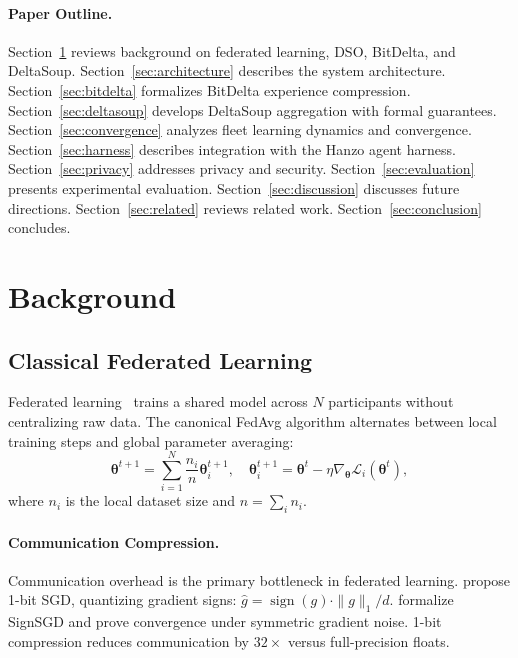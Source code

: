 \documentclass[11pt]{article}
\DeclareMathOperator{\sign}{sign}
\begin{document}
\paragraph{Paper Outline.}
Section~\ref{sec:background} reviews background on federated learning, DSO, BitDelta,
and DeltaSoup. Section~\ref{sec:architecture} describes the system architecture.
Section~\ref{sec:bitdelta} formalizes BitDelta experience compression.
Section~\ref{sec:deltasoup} develops DeltaSoup aggregation with formal guarantees.
Section~\ref{sec:convergence} analyzes fleet learning dynamics and convergence.
Section~\ref{sec:harness} describes integration with the Hanzo agent harness.
Section~\ref{sec:privacy} addresses privacy and security.
Section~\ref{sec:evaluation} presents experimental evaluation.
Section~\ref{sec:discussion} discusses future directions.
Section~\ref{sec:related} reviews related work.
Section~\ref{sec:conclusion} concludes.

\section{Background}
\label{sec:background}

\subsection{Classical Federated Learning}

Federated learning~\cite{mcmahan2017communication} trains a shared model
across $N$ participants without centralizing raw data. The canonical
FedAvg algorithm alternates between local training steps and global parameter
averaging:
\begin{equation}
    \bm{\theta}^{t+1} = \sum_{i=1}^{N} \frac{n_i}{n} \bm{\theta}_i^{t+1},
    \quad \bm{\theta}_i^{t+1} = \bm{\theta}^t - \eta \nabla_{\bm{\theta}} \mathcal{L}_i(\bm{\theta}^t),
\end{equation}
where $n_i$ is the local dataset size and $n = \sum_i n_i$.

\paragraph{Communication Compression.}
Communication overhead is the primary bottleneck in federated learning.
\cite{seide20141bit} propose 1-bit SGD, quantizing gradient signs:
$\hat{g} = \sign(g) \cdot \|g\|_1 / d$.
\cite{bernstein2018signsgd} formalize SignSGD and prove convergence under
symmetric gradient noise. 1-bit compression reduces communication by $32\times$
versus full-precision floats.
\end{document}
